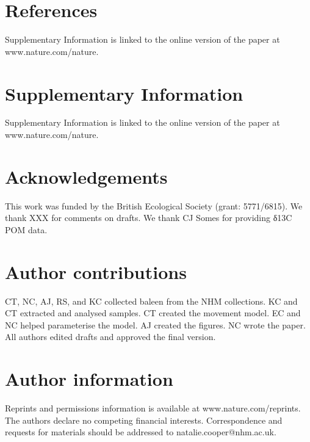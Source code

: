 \documentclass[a4paper,12pt]{article}
\begin{document}
\section{References}




Supplementary Information is linked to the online version of the paper at www.nature.com/nature.

\section{Supplementary Information}
Supplementary Information is linked to the online version of the paper at www.nature.com/nature.

\section{Acknowledgements}
This work was funded by the British Ecological Society (grant: 5771/6815). 
We thank XXX for comments on drafts.
We thank CJ Somes for providing  δ13C POM data.

\section{Author contributions}
CT, NC, AJ, RS, and KC collected baleen from the NHM collections. 
KC and CT extracted and analysed samples.
CT created the movement model.
EC and NC helped parameterise the model.
AJ created the figures. 
NC wrote the paper.
All authors edited drafts and approved the final version.

\section{Author information}
Reprints and permissions information is available at www.nature.com/reprints.
The authors declare no competing financial interests.
Correspondence and requests for materials should be addressed to natalie.cooper@nhm.ac.uk.





\end{document}
